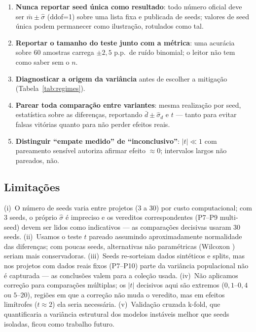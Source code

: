 \documentclass[12pt]{article}
\begin{document}
\begin{enumerate}
  \item \textbf{Nunca reportar seed única como resultado}: todo número
        oficial deve ser $\bar{m} \pm \hat{\sigma}$ (ddof=1) sobre uma lista
        fixa e publicada de seeds; valores de seed única podem permanecer
        como ilustração, rotulados como tal.
  \item \textbf{Reportar o tamanho do teste junto com a métrica}: uma
        acurácia sobre 60 amostras carrega $\pm 2{,}5$ p.p.\ de ruído
        binomial; o leitor não tem como saber sem o $n$.
  \item \textbf{Diagnosticar a origem da variância} antes de escolher a
        mitigação (Tabela~\ref{tab:regimes}).
  \item \textbf{Parear toda comparação entre variantes}: mesma realização por
        seed, estatística sobre as diferenças, reportando $\bar{d} \pm
        \hat{\sigma}_d$ e $t$ --- tanto para evitar falsas vitórias quanto
        para não perder efeitos reais.
  \item \textbf{Distinguir ``empate medido'' de ``inconclusivo''}: $|t| \ll
        1$ com pareamento sensível autoriza afirmar efeito $\approx 0$;
        intervalos largos não pareados, não.
\end{enumerate}

\subsection{Limitações}\label{sec:ana-lim}

(i)~O número de seeds varia entre projetos (3 a 30) por custo computacional;
com 3 seeds, o próprio $\hat{\sigma}$ é impreciso e os vereditos
correspondentes (P7--P9 multi-seed) devem ser lidos como indicativos ---
as comparações decisivas usaram 30 seeds. (ii)~Usamos o teste $t$ pareado
assumindo aproximadamente normalidade das diferenças; com poucas seeds,
alternativas não paramétricas (Wilcoxon \cite{demsar2006}) seriam mais
conservadoras. (iii)~Seeds re-sorteiam dados sintéticos e splits, mas nos
projetos com dados reais fixos (P7--P10) parte da variância populacional não
é capturada --- as conclusões valem para a coleção usada. (iv)~Não aplicamos
correção para comparações múltiplas; os $|t|$ decisivos aqui são extremos
($0{,}1$--$0{,}4$ ou $5$--$20$), regiões em que a correção não muda o
veredito, mas em efeitos limítrofes ($t \approx 2$) ela seria necessária.
(v)~Validação cruzada k-fold, que quantificaria a variância estrutural dos
modelos instáveis melhor que seeds isoladas, ficou como trabalho futuro.
\end{document}
